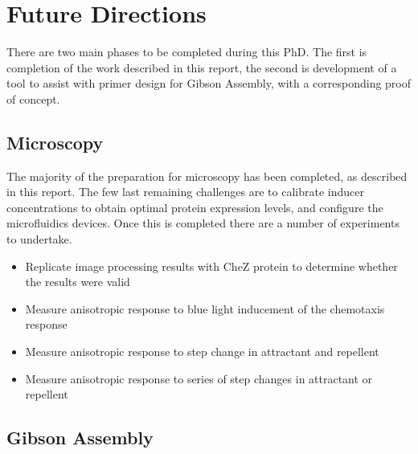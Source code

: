 \documentclass[../main.tex]{subfiles}
\begin{document}
\section{Future Directions}

There are two main phases to be completed during this PhD. The first is completion of the work described in this report, the second is development of a tool to assist with primer design for Gibson Assembly, with a corresponding proof of concept.

\subsection{Microscopy}

The majority of the preparation for microscopy has been completed, as described in this report. The few last remaining challenges are to calibrate inducer concentrations to obtain optimal protein expression levels, and configure the microfluidics devices. Once this is completed there are a number of experiments to undertake.

\begin{itemize}

\item {Replicate image processing results} with CheZ protein to determine whether the results were valid

\item {Measure anisotropic response} to blue light inducement of the chemotaxis response

\item {Measure anisotropic response} to step change in attractant and repellent

\item {Measure anisotropic response} to series of step changes in attractant or repellent

\end{itemize}

\subsection{Gibson Assembly}
\end{document}
